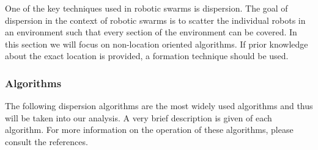 One of the key techniques used in robotic swarms is dispersion. The goal of dispersion in the context of robotic swarms is to scatter the individual robots in an environment such that every section of the environment can be covered. In this section we will focus on non-location oriented algorithms. If prior knowledge about the exact location is provided, a formation technique should be used.

\subsubsection{Algorithms}
  The following dispersion algorithms are the most widely used algorithms and thus will be taken into our analysis. A very brief description is given of each algorithm. For more information on the operation of these algorithms, please consult the references.\\

